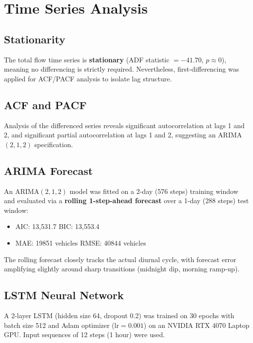 \documentclass[12pt,a4paper]{article}
\begin{document}
\section{Time Series Analysis}

\subsection{Stationarity}

The total flow time series is \textbf{stationary} (ADF statistic $= -41.70$, $p \approx 0$), meaning no differencing is strictly required. Nevertheless, first-differencing was applied for ACF/PACF analysis to isolate lag structure.

\subsection{ACF and PACF}

Analysis of the differenced series reveals significant autocorrelation at lags 1 and 2, and significant partial autocorrelation at lags 1 and 2, suggesting an ARIMA$(2,1,2)$ specification.

\subsection{ARIMA Forecast}

An ARIMA$(2,1,2)$ model was fitted on a 2-day (576 steps) training window and evaluated via a \textbf{rolling 1-step-ahead forecast} over a 1-day (288 steps) test window:

\begin{itemize}
    \item AIC: 13,531.7 \quad BIC: 13,553.4
    \item MAE: \num{19851} vehicles \quad RMSE: \num{40844} vehicles
\end{itemize}

The rolling forecast closely tracks the actual diurnal cycle, with forecast error amplifying slightly around sharp transitions (midnight dip, morning ramp-up).

\subsection{LSTM Neural Network}

A 2-layer LSTM (hidden size 64, dropout 0.2) was trained on 30 epochs with batch size 512 and Adam optimizer ($\text{lr}=0.001$) on an NVIDIA RTX 4070 Laptop GPU. Input sequences of 12 steps (1 hour) were used.
\end{document}
